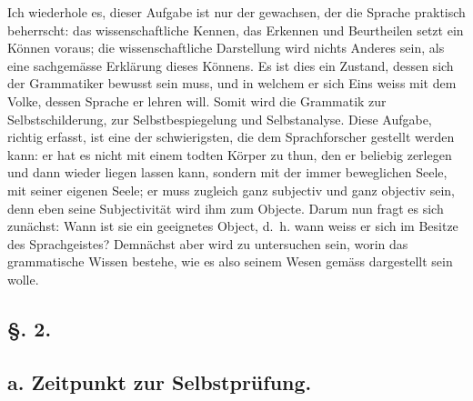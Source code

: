 Ich wiederhole es, dieser Aufgabe ist nur der gewachsen, der die Sprache praktisch beherrscht: das wissenschaftliche Kennen, das Erkennen und Beurtheilen setzt ein Können voraus; die wissenschaftliche Darstellung wird nichts Anderes sein, als eine sachgemässe Erklärung dieses Könnens. Es ist dies ein Zustand, dessen sich der Grammatiker bewusst sein muss, und in welchem er sich Eins weiss mit dem Volke, dessen Sprache er lehren will. Somit wird die Grammatik zur Selbstschilderung, zur Selbstbespiegelung und Selbstanalyse. Diese Aufgabe, richtig erfasst, ist eine der schwierigsten, die dem Sprachforscher gestellt werden kann: er hat es nicht mit einem todten Körper zu thun, den er beliebig zerlegen und dann wieder liegen lassen kann, sondern mit der immer beweglichen Seele, mit seiner eigenen Seele; er muss zugleich ganz subjectiv und ganz objectiv sein, denn eben seine Subjectivität wird ihm zum Objecte. Darum nun fragt es sich zunächst: Wann ist sie ein geeignetes Object, d.~h. wann weiss er sich im Besitze des Sprachgeistes? Demnächst aber wird zu untersuchen sein, worin das grammatische Wissen bestehe, wie es also seinem Wesen gemäss dargestellt sein wolle.

\label{sp.83}

\subsection*{§. 2.}\label{II.VI.2}
\subsection*{a. Zeitpunkt zur Selbstprüfung.}

